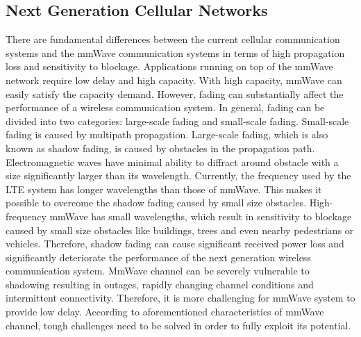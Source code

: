 \subsection{Next Generation Cellular Networks}
\label{subsec:1}
\par There are fundamental differences between the current cellular communication systems and the mmWave communication systems in terms of high propagation loss and sensitivity to blockage. Applications running on top of the mmWave network require low delay and high capacity. With high capacity, mmWave can easily satisfy the capacity demand. However, fading can substantially affect the performance of a wireless communication system. In general, fading can be divided into two categories: large-scale fading and small-scale fading. Small-scale fading is caused by multipath propagation. Large-scale fading, which is also known as shadow fading, is caused by obstacles in the propagation path. Electromagnetic waves have minimal ability to diffract around obstacle with a size significantly larger than its wavelength. Currently, the frequency used by the LTE system has longer wavelengths than those of mmWave. This makes it possible to overcome the shadow fading caused by small size obstacles. High-frequency mmWave has small wavelengths, which result in sensitivity to blockage caused by small size obstacles like buildings, trees and even nearby pedestrians or vehicles. Therefore, shadow fading  can cause significant received power loss and significantly deteriorate the performance of the next generation wireless communication system. MmWave channel can be severely vulnerable to shadowing resulting in outages, rapidly changing channel conditions and intermittent connectivity. Therefore, it is more challenging for mmWave system to provide low delay. According to aforementioned characteristics of mmWave channel, tough challenges need to be solved in order to fully exploit its potential. 


